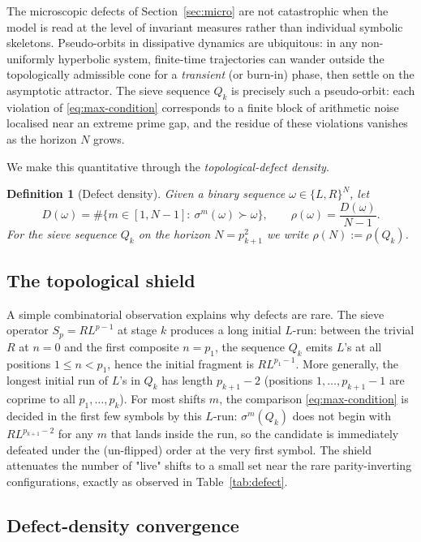\documentclass[cupthm,crop,info]{CUP-JNL-ETS}
\theoremstyle{cupplain}
\theoremstyle{cupdefinition}
\newtheorem{definition}[theorem]{Definition}
\theoremstyle{cupremark}
\numberwithin{equation}{section}
\begin{document}
The microscopic defects of Section~\ref{sec:micro} are not catastrophic
when the model is read at the level of invariant measures rather than
individual symbolic skeletons. Pseudo-orbits in dissipative dynamics are
ubiquitous: in any non-uniformly hyperbolic system, finite-time
trajectories can wander outside the topologically admissible cone for a
\emph{transient} (or burn-in) phase, then settle on the asymptotic
attractor. The sieve sequence $Q_k$ is precisely such a pseudo-orbit:
each violation of \eqref{eq:max-condition} corresponds to a finite block
of arithmetic noise localised near an extreme prime gap, and the residue
of these violations vanishes as the horizon $N$ grows.

We make this quantitative through the \emph{topological-defect density}.

\begin{definition}[Defect density]
Given a binary sequence $\omega \in \{L, R\}^N$, let
\[
    D(\omega) = \#\{m \in [1, N - 1] :\ \sigma^m(\omega) \succ \omega \},
\qquad
    \rho(\omega) = \frac{D(\omega)}{N - 1}.
\]
For the sieve sequence $Q_k$ on the horizon $N = p_{k+1}^2$ we write
$\rho(N) := \rho(Q_k)$.
\end{definition}

\subsection{The topological shield}

A simple combinatorial observation explains why defects are rare. The
sieve operator $S_p = R L^{p-1}$ at stage $k$ produces a long initial
$L$-run: between the trivial $R$ at $n = 0$ and the first composite
$n = p_1$, the sequence $Q_k$ emits $L$'s at all positions
$1 \leq n < p_1$, hence the initial fragment is $R L^{p_1 - 1}$. More
generally, the longest initial run of $L$'s in $Q_k$ has length
$p_{k+1} - 2$ (positions $1, \ldots, p_{k+1} - 1$ are coprime to all
$p_1, \ldots, p_k$). For most shifts $m$, the comparison
\eqref{eq:max-condition} is decided in the first few symbols by this
$L$-run: $\sigma^m(Q_k)$ does not begin with $R L^{p_{k+1} - 2}$ for any
$m$ that lands inside the run, so the candidate is immediately defeated
under the (un-flipped) order at the very first symbol. The shield
attenuates the number of "live" shifts to a small set near the rare
parity-inverting configurations, exactly as observed in
Table~\ref{tab:defect}.

\subsection{Defect-density convergence}
\end{document}
